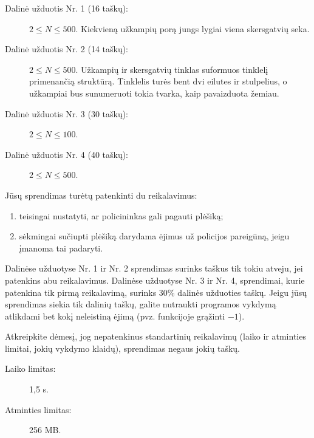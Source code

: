 \documentclass{boi2014-lt}
\begin{document}
    \begin{description}
        \item[Dalinė užduotis Nr. 1 (16 taškų):] $2 \le N \le 500$.
        Kiekvieną užkampių porą jungs lygiai viena skersgatvių seka.
        \item[Dalinė užduotis Nr. 2 (14 taškų):] $2 \le N \le 500$.
			Užkampių ir skersgatvių tinklas suformuos tinklelį primenančią struktūrą.
			Tinklelis turės bent dvi eilutes ir stulpelius, o užkampiai bus
			sunumeruoti tokia tvarka, kaip pavaizduota žemiau.
        \begin{figure}[h!]
           \centering
        \end{figure}
        \item[Dalinė užduotis Nr. 3 (30 taškų):] $2 \le N \le 100$.
        \item[Dalinė užduotis Nr. 4 (40 taškų):] $2 \le N \le 500$.
    \end{description}
    
    Jūsų sprendimas turėtų patenkinti du reikalavimus:
    \begin{enumerate}
    	\item teisingai nustatyti, ar policininkas gali pagauti plėšiką;
		\item sėkmingai sučiupti plėšiką darydama ėjimus už policijos
			pareigūną, jeigu įmanoma tai padaryti.
    \end{enumerate}
    
	Dalinėse užduotyse Nr. 1 ir Nr. 2 sprendimas surinks taškus tik tokiu
	atveju, jei patenkins abu reikalavimus.
	Dalinėse užduotyse Nr. 3 ir Nr. 4, sprendimai, kurie patenkina tik pirmą
	reikalavimą, surinks 30\% dalinės užduoties taškų.
	Jeigu jūsų sprendimas siekia tik dalinių taškų, galite nutraukti programos
	vykdymą atlikdami bet kokį neleistiną ėjimą (pvz. funkcijoje
	 grąžinti $-1$).

	Atkreipkite dėmesį, jog nepatenkinus standartinių reikalavimų (laiko ir
	atminties limitai, jokių vykdymo klaidų), sprendimas negaus jokių taškų.
    
    \Constraints
    
    \begin{description}
        \item[Laiko limitas:] 1,5 s.
        \item[Atminties limitas:] 256 MB.
    \end{description}
\end{document}
